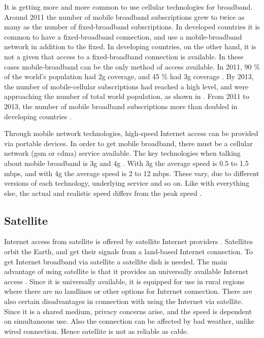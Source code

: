 It is getting more and more common to use cellular technologies for broadband. Around 2011 the number of mobile broadband subscriptions grew to twice as many as the number of fixed-broadband subscriptions. In developed countries it is common to have a fixed-broadband connection, and use a mobile-broadband network in addition to the fixed. In developing countries, on the other hand, it is not a given that access to a fixed-broadband connection is available. In these cases mobile-broadband can be the only method of access available. In 2011, 90 \% of the world's population had \gls{2g} coverage, and 45 \% had \gls{3g} coverage \cite{itu2011}. By 2013, the number of mobile-cellular subscriptions had reached a high level, and were approaching the number of total world population, as shown in . From 2011 to 2013, the number of mobile broadband subscriptions more than doubled in developing countries \cite{itu2013}. 

Through mobile network technologies, high-speed Internet access can be provided via portable devices. In order to get mobile broadband, there must be a cellular network (\gls{gsm} or \gls{cdma}) service available. The key technologies when talking about mobile broadband is \gls{3g} and \gls{4g} \cite{mobilebroadband}. With \gls{3g} the average speed is 0.5 to 1.5 \gls{mbps}, and with \gls{4g} the average speed is 2 to 12 \gls{mbps}. These vary, due to different versions of each technology, underlying service and so on. Like with everything else, the actual and realistic speed differs from the peak speed \cite{3gvs4g}. 


\subsection{Satellite}
Internet access from satellite is offered by satellite Internet providers \cite{cablevssatellite}. Satellites orbit the Earth, and get their signals from a land-based Internet connection. To get Internet broadband via satellite a satellite dish is needed. The main advantage of using satellite is that it provides an universally available Internet access \cite{broadband}. Since it is universally available, it is equipped for use in rural regions where there are no landlines or other options for Internet connection. There are also certain disadvantages in connection with using the Internet via satellite. Since it is a shared medium, privacy concerns arise, and the speed is dependent on simultaneous use. Also the connection can be affected by bad weather, unlike wired connection. Hence satellite is not as reliable as cable. 



